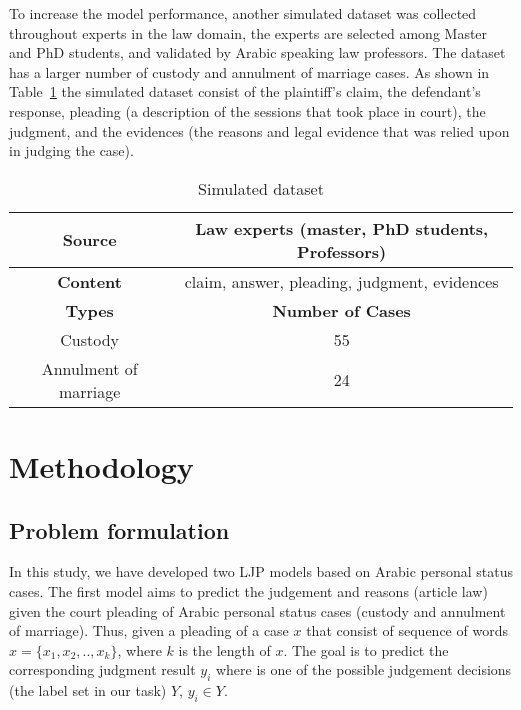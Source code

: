 \documentclass[sn-mathphys,Numbered]{sn-jnl}%
\theoremstyle{thmstyleone}%
\theoremstyle{thmstyletwo}%
\theoremstyle{thmstylethree}%
\begin{document}
To increase the model performance, another simulated dataset was collected throughout experts in the law domain, the experts are selected among Master and PhD students, and validated by Arabic speaking law professors. The dataset has a larger number of custody and annulment of marriage cases. As shown in Table~\ref{Simulated dataset} the simulated dataset consist of the plaintiff’s claim, the defendant’s response, pleading (a description of the sessions that took place in court), the judgment, and the evidences (the reasons and legal evidence that was relied upon in judging the case).




\begin{table}[h]
\centering
\begin{tabular}{|c|c|}
 \hline
 \textbf{Source}& Law experts (master, PhD students, Professors)\\
 \hline
 \textbf{Content}&claim, answer, pleading, judgment, evidences\\
 \hline
 \textbf{Types} &\textbf{Number of Cases}\\ 
 \hline
 Custody&55\\
 \hline
 Annulment of marriage&24\\
 \hline
\end{tabular}
\caption{Simulated dataset}
\label{Simulated dataset}
\end{table}

\section{Methodology}\label{sec:Exp}
\subsection{Problem formulation}
 In this study, we have developed two LJP models based on Arabic personal status cases. The first model aims to predict the judgement and reasons (article law) given %
 the court pleading of Arabic personal status cases (custody and annulment of marriage). Thus, given a pleading %
 of a case $x$ that consist of sequence of words $x= \{x_1,x_2,..,x_k\}$, where $k$ is the length of $x$. The goal is to predict the corresponding judgment result $y_i$ where is one of the possible judgement decisions (the label set in our task) $Y$, $y_i\in Y$. 
 
\end{document}
